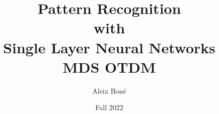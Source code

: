 


\usepackage{tikz}
\usepackage{pgfplots}
\pgfplotsset{compat=1.18}

\tikzexternalize %

\usepackage[separate-uncertainty]{siunitx}

\usepackage{fancyvrb}
\usepackage{tabularray}
\usepackage{fancyhdr}



\makeatletter
\g@addto@macro\@floatboxreset\centering
\makeatother




\renewcommand\and{\\[\baselineskip]}

\title{\Huge Pattern Recognition \\ with \\ Single Layer Neural Networks\\[1em]
\Large \hphantom{M}MDS \textendash{} OTDM}
\author{Aleix Boné}
\date{Fall 2022}

\usepackage{printlen}



